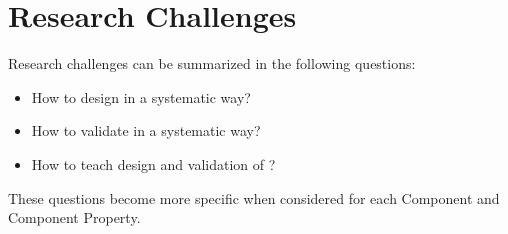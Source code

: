\documentclass[10pt, final, conference, compsocconf]{IEEEtran}
\begin{document}





\section{Research Challenges}\label{s:challenges}
Research challenges can be summarized in the following questions:

\begin{itemize}
\item{How to design  in a systematic way?}
\item{How to validate  in a systematic way?}
\item{How to teach design and validation of ?}
\end{itemize}

These questions become more specific when considered for each Component and Component Property. 
\end{document}
